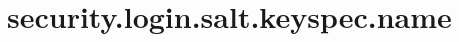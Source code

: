 \section{security.login.salt.keyspec.name}
\label{configuration:SecurityLoginSaltKeyspecName}
\TODO

